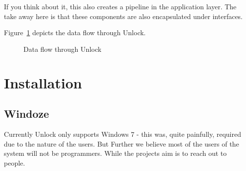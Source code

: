 \documentclass[11pt]{article}
\begin{document}
If you think about it, this also creates a pipeline in the application layer.  The take away here is that these components are also encapsulated under interfaces.

Figure~\ref{bci-pipeline-fig} depicts the data flow through Unlock.

\begin{figure}[]
\caption{\label{bci-pipeline-fig}  Data flow through Unlock}
\end{figure}



\section{Installation}
\subsection{Windoze}
Currently Unlock only supports Windows 7 - this was, quite painfully, required due to the nature of the users.  But  Further we believe most of the users of the system will not be programmers.  While the projects aim is to reach out to people.
\end{document}
